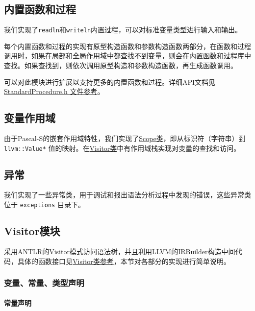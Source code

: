 \documentclass[lang=cn,11pt,a4paper,cite=authornum]{paper}
\begin{document}
\subsection{内置函数和过程}\label{builtin}

我们实现了\texttt{readln}和\texttt{writeln}内置过程，可以对标准变量类型进行输入和输出。

每个内置函数和过程的实现有原型构造函数和参数构造函数两部分，在函数和过程调用时，如果在局部和全局作用域中都查找不到变量，则会在内置函数和过程库中查找。如果查找到，则依次调用原型构造和参数构造函数，再生成函数调用。

可以对此模块进行扩展以支持更多的内置函数和过程。详细API文档见\href{run:./html/_standard_procedure_8h.html}{StandardProcedure.h 文件参考}。

\subsection{变量作用域}

由于Pascal-S的嵌套作用域特性，我们实现了\href{run:./html/class_pascal_s_1_1_scope.html}{Scope类}，即从标识符（字符串）到 \texttt{llvm::Value*} 值的映射。在\href{run:/html/class_pascal_s_1_1_visitor.html#a3d97ad664fec63969c205d7a33f8cfc0}{Visitor类}中有作用域栈实现对变量的查找和访问。

\subsection{异常}

我们实现了一些异常类，用于调试和报出语法分析过程中发现的错误，这些异常类位于 \texttt{exceptions} 目录下。

\subsection{Visitor模块}

采用ANTLR的Visitor模式访问语法树，并且利用LLVM的IRBuilder构造中间代码，具体的函数接口见\href{run:./html/class_pascal_s_1_1_visitor.html}{Visitor类参考}，本节对各部分的实现进行简单说明。

\subsubsection{变量、常量、类型声明}

\paragraph{常量声明}
\end{document}
